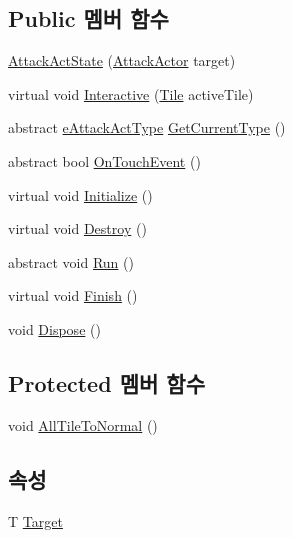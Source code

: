 \subsection*{Public 멤버 함수}
\begin{DoxyCompactItemize}
\item 
\hyperlink{class_attack_actor_1_1_attack_act_state_ab084b28b7bfaec2033a5102a48303af5}{Attack\+Act\+State} (\hyperlink{class_attack_actor}{Attack\+Actor} target)
\item 
virtual void \hyperlink{class_attack_actor_1_1_attack_act_state_a2ae9dd2f7ec8db76d25d7ad7ed58b89d}{Interactive} (\hyperlink{class_tile}{Tile} active\+Tile)
\item 
abstract \hyperlink{_attack_actor_8cs_a10659ce944335df4ded984f6bc41f31b}{e\+Attack\+Act\+Type} \hyperlink{class_attack_actor_1_1_attack_act_state_a8657ce92996ace441bb68b9e3002aa56}{Get\+Current\+Type} ()
\item 
abstract bool \hyperlink{class_attack_actor_1_1_attack_act_state_aa5e1794a3ede54c3b71a1463bf5b79a4}{On\+Touch\+Event} ()
\item 
virtual void \hyperlink{class_m_c_n_1_1_state_a8eabaffe047e6dccd5c5d8aed7bf218a}{Initialize} ()
\item 
virtual void \hyperlink{class_m_c_n_1_1_state_a32af22a6a0a979d3b3a80225426aa839}{Destroy} ()
\item 
abstract void \hyperlink{class_m_c_n_1_1_state_a8adfea67c55997e5c0eefbae1e429f4d}{Run} ()
\item 
virtual void \hyperlink{class_m_c_n_1_1_state_a6de4f94b23916fcd05f589759da9ac3f}{Finish} ()
\item 
void \hyperlink{class_m_c_n_1_1_state_a6c53b2eda47e718ff469fd76a95cf02a}{Dispose} ()
\end{DoxyCompactItemize}
\subsection*{Protected 멤버 함수}
\begin{DoxyCompactItemize}
\item 
void \hyperlink{class_attack_actor_1_1_attack_act_state_a993762ec959af926e416f03fa7b71203}{All\+Tile\+To\+Normal} ()
\end{DoxyCompactItemize}
\subsection*{속성}
\begin{DoxyCompactItemize}
\item 
T \hyperlink{class_m_c_n_1_1_state_a93ba2fd920292031bd6e65b1dc505cb3}{Target}
\end{DoxyCompactItemize}


